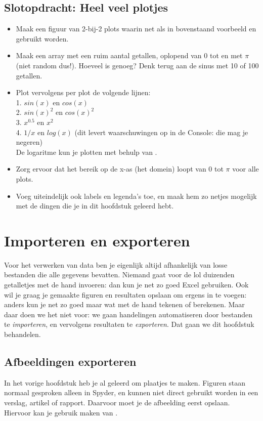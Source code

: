 \documentclass[a4paper,11pt, fleqn]{article}
\newcommand{\ditwc}{Naam van het huidige werkcollege}
\begin{document}
\subsection{Slotopdracht: Heel veel plotjes}
\begin{itemize}
	\item Maak een figuur van 2-bij-2 plots waarin net als in bovenstaand voorbeeld  en  gebruikt worden.
	\item Maak een array  met een ruim aantal getallen, oplopend van 0 tot en met $\pi$ (niet random dus!). Hoeveel is genoeg? Denk terug aan de sinus met 10 of 100 getallen.
	\item Plot vervolgens per plot de volgende lijnen:\\
	1. $sin(x)$ en $cos(x)$\\
	2. $sin(x)^2$ en $cos(x)^2$\\
	3. $x^{0.5}$ en $x^2$\\
	4. $1/x$ en $log(x)$ (dit levert waarschuwingen op in de Console: die mag je negeren)\\
	De logaritme kun je plotten met behulp van .
	\item Zorg ervoor dat het bereik op de x-as (het domein) loopt van 0 tot $\pi$ voor alle plots.
	\item Voeg uiteindelijk ook labels en legenda's toe, en maak hem zo netjes mogelijk met de dingen die je in dit hoofdstuk geleerd hebt.
\end{itemize}


\clearpage
\renewcommand{\ditwc}{Importeren en exporteren}
\section[Importeren en exporteren]{\ditwc}
Voor het verwerken van data ben je eigenlijk altijd afhankelijk van losse bestanden die alle gegevens bevatten. Niemand gaat voor de lol duizenden getalletjes met de hand invoeren: dan kun je net zo goed Excel gebruiken. Ook wil je graag je gemaakte figuren en resultaten opslaan om ergens in te voegen: anders kun je net zo goed maar wat met de hand tekenen of berekenen. Maar daar doen we het niet voor: we gaan handelingen automatiseren door bestanden te \textit{importeren}, en vervolgens resultaten te \textit{exporteren}. Dat gaan we dit hoofdstuk behandelen.

\subsection{Afbeeldingen exporteren}
In het vorige hoofdstuk heb je al geleerd om plaatjes te maken. Figuren staan normaal gesproken alleen in Spyder, en kunnen niet direct gebruikt worden in een verslag, artikel of rapport. Daarvoor moet je de afbeelding eerst opslaan. Hiervoor kan je gebruik maken van .
\end{document}
